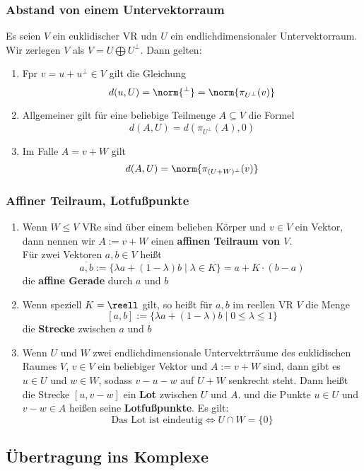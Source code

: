 \documentclass{kit}
\begin{document}
    \subsubsection{Abstand von einem Untervektorraum}
      Es seien $V$ ein euklidischer VR udn $U$ ein endlichdimensionaler Untervektorraum. Wir zerlegen $V$ als 
      $V=U\bigoplus U^\perp$. Dann gelten:
      \begin{enumerate}
        \item Fpr $v=u+u^\perp\in V$ gilt die Gleichung
          $$d(u,U)=\norm{^\perp}=\norm{\pi_{U^\perp}(v)}$$
        \item Allgemeiner gilt für eine beliebige Teilmenge $A\subseteq V$ die Formel
          $$d(A,U)=d(\pi_{U^\perp}(A),0)$$
        \item Im Falle $A=v+W$ gilt
          $$d(A,U)=\norm{\pi_{(U+W)^\perp}(v)}$$
      \end{enumerate}
    \subsubsection{Affiner Teilraum, Lotfußpunkte}
      \begin{enumerate}
        \item Wenn $W\le V$ VRe sind über einem belieben Körper und $v\in V$ ein Vektor, dann nennen wir $A:=v+W$ einen 
          \textbf{affinen Teilraum von $V$}.\\
          Für zwei Vektoren $a,b\in V$ heißt
          $$\overline{a,b}:=\{\lambda a+(1-\lambda)b\mid\lambda\in K\}=a+K\cdot(b-a)$$
          die \textbf{affine Gerade} durch $a$ und $b$
        \item Wenn speziell $K=\reell$ gilt, so heißt für $a,b$ im reellen VR $V$ die Menge
        $$[a,b]:=\{\lambda a+(1-\lambda)b\mid0\le\lambda\le1\}$$
        die \textbf{Strecke} zwischen $a$ und $b$
      \item Wenn $U$ und $W$ zwei endlichdimensionale Untervektrräume des euklidischen Raumes $V$, $v\in V$ ein beliebiger
        Vektor und $A:=v+W$ sind, dann gibt es $u\in U$ und $w\in W$, sodass $v-u-w$ auf $U+W$ senkrecht steht. Dann heißt
        die Strecke $[u,v-w]$ ein \textbf{Lot} zwischen $U$ und $A$. und die Punkte $u\in U$ und $v-w\in A$ heißen seine
        \textbf{Lotfußpunkte}. Es gilt:
        $$\text{Das Lot ist eindeutig}\Longleftrightarrow U\cap W=\{0\}$$
      \end{enumerate}
  \subsection{Übertragung ins Komplexe}
\end{document}
